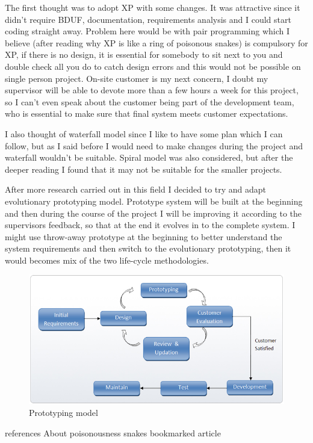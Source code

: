 \documentclass[]{report}
\begin{document}
The first thought was to adopt XP with some changes. It was attractive since it didn't require BDUF, documentation, requirements analysis and I could start coding straight away. Problem here would be with pair programming which I believe (after reading why XP is like a ring of poisonous snakes) is compulsory for XP, if there is no design, it is essential for somebody to sit next to you and double check all you do to catch design errors and this would not be possible on single person project. On-site customer is my next concern, I doubt my supervisor will be able to devote more than a few hours a week for this project, so I can't even speak about the customer being part of the development team, who is essential to make sure that final system meets customer expectations.

I also thought of waterfall model since I like to have some plan which I can follow, but as I said before I would need to make changes during the project and waterfall wouldn't be suitable. Spiral model was also considered, but after the deeper reading I found that it may not be suitable for the smaller projects.

After more research carried out in this field I decided to try and adapt evolutionary prototyping model. Prototype system will be built at the beginning and then during the course of the project I will be improving it according to the supervisors feedback, so that at the end it evolves in to the complete system. I might use throw-away prototype at the beginning to better understand the system requirements and then switch to the evolutionary prototyping, then it would becomes mix of the two life-cycle methodologies.

\begin{figure}[H]
\centering
\centerline{\includegraphics[scale=0.55]{./prototype_methodology}}
\caption{Prototyping model \cite{}}
\label{fig:i-s-hierarchy-tree-march-2012}
\end{figure}


 
 references
 About poisonousness snakes
 bookmarked article
 
\end{document}
